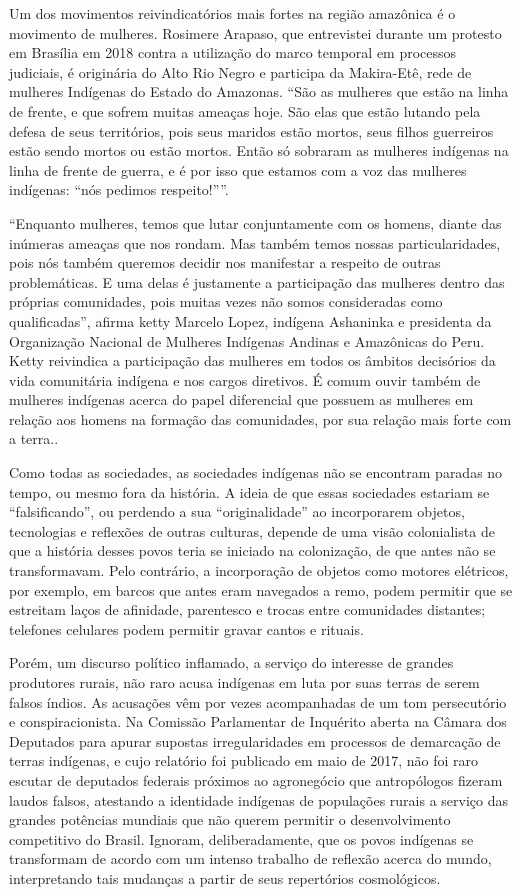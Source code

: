 Um dos movimentos reivindicatórios mais fortes na região amazônica é o
movimento de mulheres. Rosimere Arapaso, que entrevistei durante um
protesto em Brasília em 2018 contra a utilização do marco temporal em
processos judiciais, é originária do Alto Rio Negro e participa da
Makira-Etê, rede de mulheres Indígenas do Estado do Amazonas. ``São as
mulheres que estão na linha de frente, e que sofrem muitas ameaças hoje.
São elas que estão lutando pela defesa de seus territórios, pois seus
maridos estão mortos, seus filhos guerreiros estão sendo mortos ou estão
mortos. Então só sobraram as mulheres indígenas na linha de frente de
guerra, e é por isso que estamos com a voz das mulheres indígenas: ``nós
pedimos respeito!''''.

``Enquanto mulheres, temos que lutar conjuntamente com os homens, diante
das inúmeras ameaças que nos rondam. Mas também temos nossas
particularidades, pois nós também queremos decidir nos manifestar a
respeito de outras problemáticas. E uma delas é justamente a
participação das mulheres dentro das próprias comunidades, pois muitas
vezes não somos consideradas como qualificadas'', afirma ketty Marcelo
Lopez, indígena Ashaninka e presidenta da Organização Nacional de
Mulheres Indígenas Andinas e Amazônicas do Peru. Ketty reivindica a
participação das mulheres em todos os âmbitos decisórios da vida
comunitária indígena e nos cargos diretivos. É comum ouvir também de
mulheres indígenas acerca do papel diferencial que possuem as mulheres
em relação aos homens na formação das comunidades, por sua relação mais
forte com a terra..

Como todas as sociedades, as sociedades indígenas não se encontram
paradas no tempo, ou mesmo fora da história. A ideia de que essas
sociedades estariam se ``falsificando'', ou perdendo a sua
``originalidade'' ao incorporarem objetos, tecnologias e reflexões de
outras culturas, depende de uma visão colonialista de que a história
desses povos teria se iniciado na colonização, de que antes não se
transformavam. Pelo contrário, a incorporação de objetos como motores
elétricos, por exemplo, em barcos que antes eram navegados a remo, podem
permitir que se estreitam laços de afinidade, parentesco e trocas entre
comunidades distantes; telefones celulares podem permitir gravar cantos
e rituais.

Porém, um discurso político inflamado, a serviço do interesse de grandes
produtores rurais, não raro acusa indígenas em luta por suas terras de
serem falsos índios. As acusações vêm por vezes acompanhadas de um tom
persecutório e conspiracionista. Na Comissão Parlamentar de Inquérito
aberta na Câmara dos Deputados para apurar supostas irregularidades em
processos de demarcação de terras indígenas, e cujo relatório foi
publicado em maio de 2017, não foi raro escutar de deputados federais
próximos ao agronegócio que antropólogos fizeram laudos falsos,
atestando a identidade indígenas de populações rurais a serviço das
grandes potências mundiais que não querem permitir o desenvolvimento
competitivo do Brasil. Ignoram, deliberadamente, que os povos indígenas
se transformam de acordo com um intenso trabalho de reflexão acerca do
mundo, interpretando tais mudanças a partir de seus repertórios
cosmológicos.

